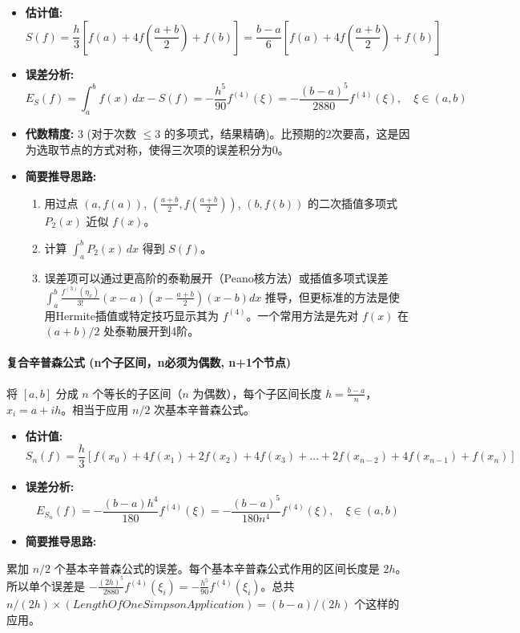 \begin{itemize}
	\item \textbf{估计值:}
\[
S(f) = \frac{h}{3} [f(a) + 4f(\frac{a+b}{2}) + f(b)] = \frac{b-a}{6} [f(a) + 4f(\frac{a+b}{2}) + f(b)]
\]	\item \textbf{误差分析:}
\[
E_S(f) = \int_a^b f(x) \, dx - S(f) = -\frac{h^5}{90} f^{(4)}(\xi) = -\frac{(b-a)^5}{2880} f^{(4)}(\xi), \quad \xi \in (a,b)
\]	\item \textbf{代数精度:} 3 (对于次数 $\le 3$ 的多项式，结果精确)。比预期的2次要高，这是因为选取节点的方式对称，使得三次项的误差积分为0。
	\item \textbf{简要推导思路:}
	\begin{enumerate}
		\item 用过点 $(a, f(a))$, $(\frac{a+b}{2}, f(\frac{a+b}{2}))$, $(b, f(b))$ 的二次插值多项式 $P_2(x)$ 近似 $f(x)$。
		\item 计算 $\int_a^b P_2(x) \, dx$ 得到 $S(f)$。
		\item 误差项可以通过更高阶的泰勒展开（Peano核方法）或插值多项式误差 $\int_a^b \frac{f^{(3)}(\eta_x)}{3!} (x-a)(x-\frac{a+b}{2})(x-b)dx$ 推导，但更标准的方法是使用Hermite插值或特定技巧显示其为 $f^{(4)}$。一个常用方法是先对 $f(x)$ 在 $(a+b)/2$ 处泰勒展开到4阶。
	\end{enumerate}
\end{itemize}

\paragraph{复合辛普森公式 (n个子区间，n必须为偶数, n+1个节点)}

将 $[a,b]$ 分成 $n$ 个等长的子区间（$n$ 为偶数），每个子区间长度 $h = \frac{b-a}{n}$，$x_i = a+ih$。相当于应用 $n/2$ 次基本辛普森公式。

\begin{itemize}
	\item \textbf{估计值:}
\[
S_n(f) = \frac{h}{3} [f(x_0) + 4f(x_1) + 2f(x_2) + 4f(x_3) + \dots + 2f(x_{n-2}) + 4f(x_{n-1}) + f(x_n)]
\]	\item \textbf{误差分析:}
\[
E_{S_n}(f) = -\frac{(b-a)h^4}{180} f^{(4)}(\xi) = -\frac{(b-a)^5}{180n^4} f^{(4)}(\xi), \quad \xi \in (a,b)
\]	\item \textbf{简要推导思路:}
\end{itemize}

累加 $n/2$ 个基本辛普森公式的误差。每个基本辛普森公式作用的区间长度是 $2h$。所以单个误差是 $-\frac{(2h)^5}{2880}f^{(4)}(\xi_i) = -\frac{h^5}{90}f^{(4)}(\xi_i)$。总共 $n/(2h) \times (Length Of One Simpson Application) = (b-a)/(2h)$ 个这样的应用。

